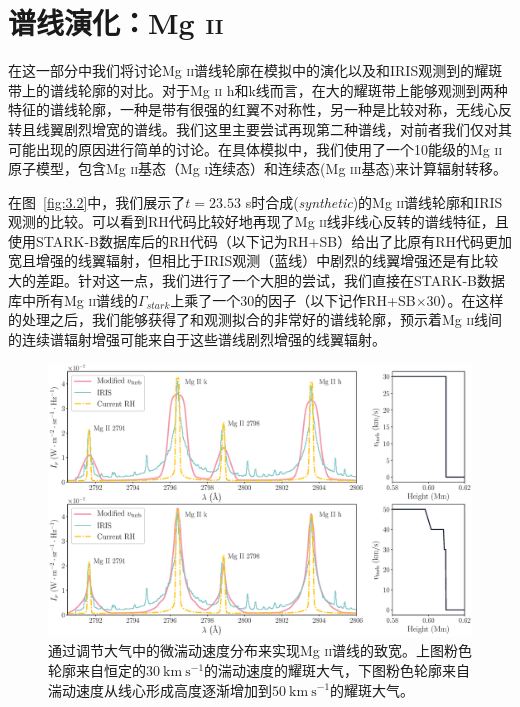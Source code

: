 \section{谱线演化：Mg \textsc{ii}}\label{sec:3.4}
在这一部分中我们将讨论Mg \textsc{ii}谱线轮廓在模拟中的演化以及和IRIS观测到的耀斑带上的谱线轮廓的对比。对于Mg \textsc{ii} h和k线而言，在大的耀斑带上能够观测到两种特征的谱线轮廓，一种是带有很强的红翼不对称性，另一种是比较对称，无线心反转且线翼剧烈增宽的谱线\parencites{Panos2018}。我们这里主要尝试再现第二种谱线，对前者我们仅对其可能出现的原因进行简单的讨论。在具体模拟中，我们使用了一个10能级的Mg \textsc{ii}原子模型，包含Mg \textsc{ii}基态（Mg \textsc{i}连续态）和连续态(Mg \textsc{iii}基态)来计算辐射转移。

在图~\ref{fig:3.2}中，我们展示了$t=23.53$ s时合成(\textit{synthetic})的Mg \textsc{ii}谱线轮廓和IRIS观测的比较。可以看到RH代码比较好地再现了Mg \textsc{ii}线非线心反转的谱线特征，且使用STARK-B数据库后的RH代码（以下记为RH+SB）给出了比原有RH代码更加宽且增强的线翼辐射，但相比于IRIS观测（蓝线）中剧烈的线翼增强还是有比较大的差距。针对这一点，我们进行了一个大胆的尝试，我们直接在STARK-B数据库中所有Mg \textsc{ii}谱线的$\Gamma_{stark}$上乘了一个30的因子（以下记作RH+SB$\times$30）。在这样的处理之后，我们能够获得了和观测拟合的非常好的谱线轮廓，预示着Mg \textsc{ii}线间的连续谱辐射增强可能来自于这些谱线剧烈增强的线翼辐射。

\begin{figure}
	\centering
	\includegraphics[width=\textwidth]{figs/MgII_vturb}
	\caption{通过调节大气中的微湍动速度分布来实现Mg \textsc{ii}谱线的致宽。上图粉色轮廓来自恒定的$30\ \mathrm{km \  s^{-1}}$的湍动速度的耀斑大气，下图粉色轮廓来自湍动速度从线心形成高度逐渐增加到$50\ \mathrm{km \  s^{-1}}$的耀斑大气。}\label{fig:3.3}
\end{figure}

